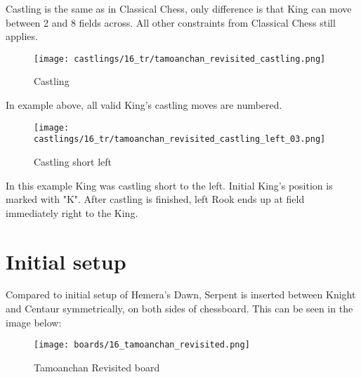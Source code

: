 Castling is the same as in Classical Chess, only difference is that King can move between 2 and 8 fields across.
All other constraints from Classical Chess still applies.

\noindent
\begin{figure}[!h]
\texttt{[image: castlings/16\_tr/tamoanchan\_revisited\_castling.png]}
\caption{Castling}
\label{fig:tamoanchan_revisited_castling}
\end{figure}

In example above, all valid King's castling moves are numbered.

\noindent
\begin{figure}[!h]
\texttt{[image: castlings/16\_tr/tamoanchan\_revisited\_castling\_left\_03.png]}
\caption{Castling short left}
\label{fig:tamoanchan_revisited_castling_left_03}
\end{figure}

In this example King was castling short to the left. Initial King's position is marked with "K".
After castling is finished, left Rook ends up at field immediately right to the King.

\clearpage %

\section*{Initial setup}

Compared to initial setup of Hemera's Dawn, Serpent is inserted between Knight and Centaur
symmetrically, on both sides of chessboard. This can be seen in the image below:

\noindent
\begin{figure}[h]
\texttt{[image: boards/16\_tamoanchan\_revisited.png]}
\caption{Tamoanchan Revisited board}
\label{fig:16_tamoanchan_revisited}
\end{figure}

\clearpage %
